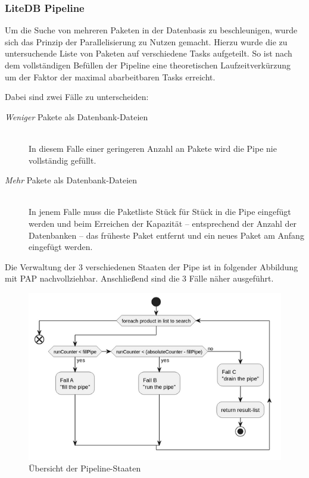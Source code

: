 \subsubsection{LiteDB Pipeline} \label{sec:ExperimentePIPE}
    Um die Suche von mehreren Paketen in der Datenbasis zu beschleunigen, wurde sich das Prinzip der Parallelisierung zu Nutzen gemacht.
    Hierzu wurde die zu untersuchende Liste von Paketen auf verschiedene Tasks aufgeteilt.
    So ist nach dem vollständigen Befüllen der Pipeline eine theoretischen Laufzeitverkürzung um der Faktor der maximal abarbeitbaren Tasks erreicht.  
    
    Dabei sind zwei Fälle zu unterscheiden:
    \begin{description}
        \item[\textit{Weniger} Pakete als Datenbank-Dateien]\hfill \\
            In diesem Falle einer geringeren Anzahl an Pakete wird die Pipe nie vollständig gefüllt.
        \item[\textit{Mehr} Pakete als Datenbank-Dateien]\hfill \\
            In jenem Falle muss die Paketliste Stück für Stück in die Pipe eingefügt werden und beim Erreichen der Kapazität -- entsprechend der Anzahl der Datenbanken -- das früheste Paket entfernt und ein neues Paket am Anfang eingefügt werden.
    \end{description}
    
    \noindent Die Verwaltung der 3 verschiedenen Staaten der Pipe ist in folgender Abbildung mit \ac{PAP} nachvollziehbar.
    Anschließend sind die 3 Fälle näher ausgeführt.
    \begin{figure}[H]
        \centering
        \includegraphics[width=\textwidth]{../pap/Simultanius search on LiteDb-Files_k.png}
        \caption{Übersicht der Pipeline-Staaten}
        \label{png:OverviewPipelineStatus}
    \end{figure}

